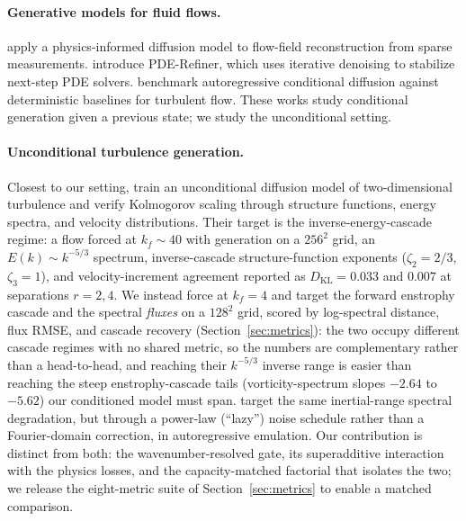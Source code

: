 \documentclass[10pt]{article} %
\begin{document}
\paragraph{Generative models for fluid flows.} \citet{shu2023diffusion} apply a physics-informed diffusion model to flow-field reconstruction from sparse measurements. \citet{lippe2023pderefiner} introduce PDE-Refiner, which uses iterative denoising to stabilize next-step PDE solvers. \citet{kohl2024benchmarking} benchmark autoregressive conditional diffusion against deterministic baselines for turbulent flow. These works study conditional generation given a previous state; we study the unconditional setting.

\paragraph{Unconditional turbulence generation.} Closest to our setting, \citet{whittaker2024turbulence} train an unconditional diffusion model of two-dimensional turbulence and verify Kolmogorov scaling through structure functions, energy spectra, and velocity distributions. Their target is the inverse-energy-cascade regime: a flow forced at $k_f\!\sim\!40$ with generation on a $256^2$ grid, an $E(k)\sim k^{-5/3}$ spectrum, inverse-cascade structure-function exponents ($\zeta_2=2/3$, $\zeta_3=1$), and velocity-increment agreement reported as $D_{\mathrm{KL}}=0.033$ and $0.007$ at separations $r=2,4$. We instead force at $k_f=4$ and target the forward enstrophy cascade and the spectral \emph{fluxes} on a $128^2$ grid, scored by log-spectral distance, flux RMSE, and cascade recovery (Section~\ref{sec:metrics}): the two occupy different cascade regimes with no shared metric, so the numbers are complementary rather than a head-to-head, and reaching their $k^{-5/3}$ inverse range is easier than reaching the steep enstrophy-cascade tails (vorticity-spectrum slopes $-2.64$ to $-5.62$) our conditioned model must span. \citet{sambamurthy2025lazy} target the same inertial-range spectral degradation, but through a power-law (``lazy'') noise schedule rather than a Fourier-domain correction, in autoregressive emulation. Our contribution is distinct from both: the wavenumber-resolved gate, its superadditive interaction with the physics losses, and the capacity-matched factorial that isolates the two; we release the eight-metric suite of Section~\ref{sec:metrics} to enable a matched comparison.
\end{document}
